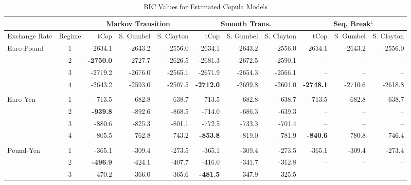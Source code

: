 \documentclass[12pt]{article}
\begin{document}
\begin{landscape}

\begin{table}
	\caption{BIC Values for Estimated Copula Models}
	\fontsize{9pt}{9pt}\selectfont
	\centering
	\begin{tabular}[c]{l c r r r | r r r | r r r}
		\midrule
		            &        & \multicolumn{3}{c}{Markov Transition} & \multicolumn{3}{c}{Smooth Trans.} & \multicolumn{3}{c}{Seq. Break$^{1}$} \\
		\midrule
		Exchange Rate& Regime & tCop & S. Gumbel & S. Clayton & tCop & S. Gumbel & S. Clayton & tCop & S. Gumbel & S. Clayton \\
		\midrule
		Euro-Pound  & 1 &          -2634.1 & -2643.2 & -2556.0 &          -2634.1 & -2643.2 & -2556.0 &           -2634.1 & -2643.2 &  -2556.0  \\		
		            & 2 & \textbf{-2750.0} & -2727.7 & -2626.5 &          -2681.3 & -2672.5 & -2590.1 &                -- &      -- &  --       \\
					& 3 &          -2719.2 & -2676.0 & -2565.1 &          -2671.9 & -2654.3 & -2566.1 &                -- &      -- &  --       \\
					& 4 &          -2643.2 & -2593.0 & -2507.5 & \textbf{-2712.0} & -2699.8 & -2601.0 &  \textbf{-2748.1} & -2710.6 &  -2618.8  \\ \\
		Euro-Yen    & 1 &           -713.5 &  -682.8 &  -638.7 &           -713.5 &  -682.8 &  -638.7 &            -713.5 &  -682.8 &   -638.7  \\
		            & 2 &  \textbf{-939.8} &  -892.6 &  -868.5 &           -714.0 &  -686.3 &  -639.3 &                -- &      -- &  --       \\
				    & 3 &           -880.6 &  -825.3 &  -801.1 &           -772.5 &  -733.3 &  -701.4 &                -- &      -- &  --       \\
				    & 4 &           -805.5 &  -762.8 &  -743.2 &  \textbf{-853.8} &  -819.0 &  -781.9 &   \textbf{-840.6} &  -780.8 &   -746.4  \\ \\
		Pound-Yen   & 1 &           -365.1 &  -309.4 &  -273.5 &           -365.1 &  -309.4 &  -273.5 &            -365.1 &  -309.4 &   -273.4  \\
		            & 2 &  \textbf{-496.9} &  -424.1 &  -407.7 &           -416.0 &  -341.7 &  -312.8 &                -- &      -- &  --       \\
				    & 3 &           -470.2 &  -366.0 &  -365.6 &  \textbf{-481.5} &  -347.9 &  -325.5 &                -- &      -- &  --       \\

\end{tabular}
\end{table}
\end{landscape}
\end{document}

